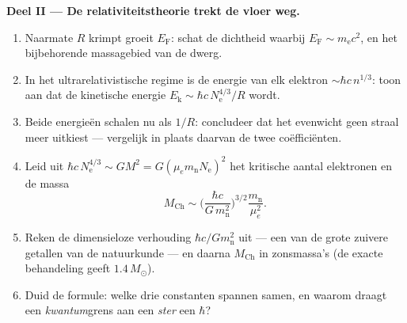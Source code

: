 \begin{problem}
\medskip\noindent\textbf{Deel II --- De relativiteitstheorie trekt de vloer
weg.}
\begin{enumerate}[resume]
  \item Naarmate $R$ krimpt groeit $E_{\text{F}}$: schat de dichtheid
        waarbij $E_{\text{F}} \sim m_{\text{e}}c^2$, en het bijbehorende
        massagebied van de dwerg.
  \item In het ultrarelativistische regime is de energie van elk elektron
        $\sim\hbar c\,n^{1/3}$: toon aan dat de kinetische energie
        $E_{\text{k}} \sim \hbar c\,N_{\text{e}}^{4/3}/R$ wordt.
  \item Beide energieën schalen nu als $1/R$: concludeer dat het evenwicht
        geen straal meer uitkiest --- vergelijk in plaats daarvan de twee
        coëfficiënten.
  \item Leid uit $\hbar c\,N_{\text{e}}^{4/3} \sim
        GM^2 = G(\mu_em_{\text{n}}N_{\text{e}})^2$ het kritische aantal
        elektronen en de massa
        \[
        M_{\text{Ch}} \sim
        \Big(\frac{\hbar c}{G\,m_{\text{n}}^2}\Big)^{3/2}
        \frac{m_{\text{n}}}{\mu_e^2} .
        \]
  \item Reken de dimensieloze verhouding $\hbar c/Gm_{\text{n}}^2$ uit ---
        een van de grote zuivere getallen van de natuurkunde --- en daarna
        $M_{\text{Ch}}$ in zonsmassa's (de exacte behandeling geeft
        $1.4\,M_\odot$).
  \item Duid de formule: welke drie constanten spannen samen, en waarom
        draagt een \emph{kwantum}grens aan een \emph{ster} een $\hbar$?
\end{enumerate}


\end{problem}
